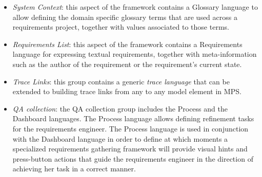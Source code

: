 \begin{itemize}
  \item \emph{System Context}: this aspect of the framework contains a
  \textsf{Glossary} language to allow defining the domain specific glossary
  terms that are used across a requirements project, together with values associated to those
  terms.
  \item \emph{Requirements List}: this aspect of the framework contains a
  \textsf{Requirements} language for expressing textual requirements, together with meta-information
  such as the author of the requirement or the requirement's current state.
  \item \emph{Trace Links}: this group contains a generic \emph{trace
  language} that can be extended to building trace links from any to any model
  element in MPS.
  \item \emph{QA collection}: the QA collection group includes the
  \textsf{Process} and the \textsf{Dashboard} languages. The \textsf{Process}
  language allows defining refinement tasks for the requirements engineer.
  The \textsf{Process} language is used in conjunction with the
  \textsf{Dashboard} language in order to define at which moments a specialized requirements
  gathering framework will provide visual hints and press-button actions that
  guide the requirements engineer in the direction of achieving her task in a
  correct manner.

\end{itemize}
\vspace{-.7cm}

